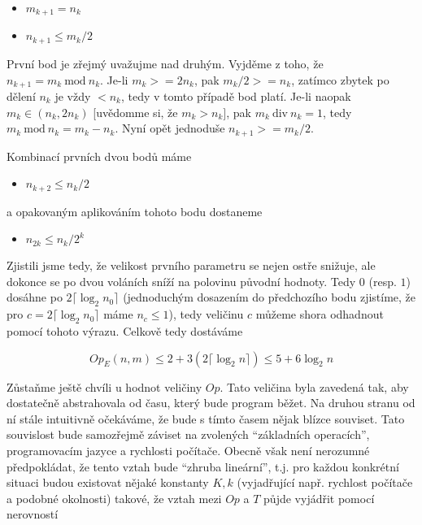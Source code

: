 \begin{itemize}
 \item $m_{k+1}=n_k$
 \item $n_{k+1}\leq m_k/2$
\end{itemize}

První bod je zřejmý uvažujme nad druhým. Vyjděme z toho, že $n_{k+1} = m_k\ \mbox{mod}\ n_k$. Je-li $m_k>=2n_k$, pak $m_k/2>=n_k$, zatímco
zbytek po dělení $n_k$ je vždy $< n_k$, tedy v tomto případě bod platí. Je-li naopak $m_k \in (n_k, 2n_k)$ [uvědomme si, že $m_k > n_k]$, pak 
$m_k\ \mbox{div}\ n_k = 1$, tedy $m_k\ \mbox{mod}\ n_k = m_k-n_k$. Nyní opět jednoduše $n_{k+1} >= m_k/2$. 

Kombinací prvních dvou bodů máme

\begin{itemize}
 \item $n_{k+2}\leq n_k/2$
\end{itemize}

a opakovaným aplikováním tohoto bodu dostaneme

\begin{itemize}
 \item $n_{2k}\leq n_k/2^{k}$
\end{itemize}

Zjistili jsme tedy, že velikost prvního parametru se nejen ostře snižuje, ale dokonce se po dvou voláních sníží na polovinu původní hodnoty. Tedy
$0$ (resp. $1$) dosáhne po $2\lceil \log_2 n_0\rceil$ (jednoduchým dosazením do předchozího bodu zjistíme, že pro $c=2\lceil \log_2 n_0\rceil$ máme
$n_c\leq1$), tedy veličinu $c$ můžeme shora odhadnout pomocí tohoto výrazu. Celkově tedy dostáváme

\begin{displaymath}
 Op_E(n,m) \leq 2 + 3(2\lceil \log_2 n\rceil)\leq 5 + 6\log_2 n
\end{displaymath}

Zůstaňme ještě chvíli u hodnot veličiny $Op$. Tato veličina byla zavedená tak, aby dostatečně abstrahovala od času, který bude program běžet. 
Na druhou stranu od ní stále intuitivně očekáváme, že bude s tímto časem nějak blízce souviset. Tato souvislost bude samozřejmě záviset na
zvolených ``základních operacích'', programovacím jazyce a rychlosti počítače. Obecně však není nerozumné předpokládat, že tento vztah bude
``zhruba lineární'', t.j. pro každou konkrétní situaci budou existovat nějaké konstanty $K,k$ (vyjadřující např. rychlost počítače a podobné okolnosti) takové, 
že vztah mezi $Op$ a $T$ půjde vyjádřit pomocí nerovností

